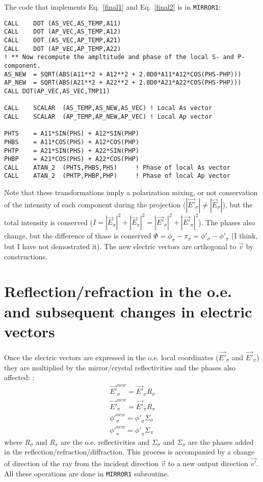 \documentclass[a4paper,10pt]{article}
\begin{document}
The code that implements Eq.~\ref{final1} and Eq.~\ref{final2} is in {\tt MIRROR1}: 

\begin{lstlisting}
CALL	DOT	(AS_VEC,AS_TEMP,A11)
CALL	DOT	(AP_VEC,AS_TEMP,A12)
CALL	DOT	(AS_VEC,AP_TEMP,A21)
CALL	DOT	(AP_VEC,AP_TEMP,A22)
! ** Now recompute the ampltitude and phase of the local S- and P- component.
AS_NEW	= SQRT(ABS(A11**2 + A12**2 + 2.0D0*A11*A12*COS(PHS-PHP)))
AP_NEW	= SQRT(ABS(A21**2 + A22**2 + 2.0D0*A21*A22*COS(PHS-PHP)))
CALL DOT(AP_VEC,AS_VEC,TMP11)

CALL	SCALAR	(AS_TEMP,AS_NEW,AS_VEC)	! Local As vector
CALL	SCALAR	(AP_TEMP,AP_NEW,AP_VEC)	! Local Ap vector

PHTS	= A11*SIN(PHS) + A12*SIN(PHP)
PHBS	= A11*COS(PHS) + A12*COS(PHP)
PHTP	= A21*SIN(PHS) + A22*SIN(PHP)
PHBP	= A21*COS(PHS) + A22*COS(PHP)
CALL	ATAN_2	(PHTS,PHBS,PHS)		! Phase of local As vector
CALL	ATAN_2	(PHTP,PHBP,PHP)		! Phase of local Ap vector
\end{lstlisting}



Note that these transformations imply a polarization mixing, or not conservation of the 
intensity of each component during the projection ($|\vec{E'}_\sigma| \ne |\vec{E}_\sigma|$),
but the total intensity is conserved ($I=|\vec{E}_\sigma|^2+|\vec{E}_\pi|^2=
|\vec{E'}_\sigma|^2+|\vec{E'}_\pi|^2$). The phases also change, but the difference of thase 
is conserved $\Phi=\phi_\sigma-\pi_\pi=\phi'_\sigma-\phi'_\pi$ (I think, but I have not demostrated it).
The new electric vectors are orthogonal to $\vec{v}$ by constructions.

\section{Reflection/refraction in the o.e. and subsequent changes in electric vectors}
Once the electric vectors are expressed in the o.e. local coordinates ($\vec{E'}_\sigma$ and 
$\vec{E'}_\pi$) they are multiplied by the mirror/crystal reflectivities and the phases also affected: : 
\begin{eqnarray}
 \label{reflectivities}
 \vec{E'}_\sigma^{new} = \vec{E'}_\sigma R_\sigma \nonumber \\
 \vec{E'}_\pi^{new} = \vec{E'}_\pi R_\pi \nonumber \\
 {\phi '}_\sigma^{new} = {\phi '}_\sigma \Sigma_\sigma \nonumber \\
 {\phi '}_\pi^{new} = {\phi '}_\pi \Sigma_\pi 
\end{eqnarray}
where $R_\sigma$ and $R_\pi$ are the o.e. reflectivities and $\Sigma_\sigma$ and $\Sigma_\pi$ are the 
phases added in the reflection/refraction/diffraction. This process is accompanied by a change of 
direction of the ray from the incident direction $\vec{v}$ to a new output direction $\vec{v'}$. 
All these operations are done in {\tt MIRROR1} subroutine.
\end{document}
